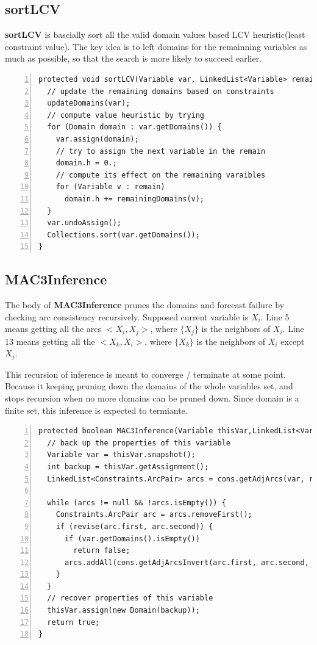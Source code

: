 \documentclass{article}
\begin{document}
\subsection{sortLCV}

\textbf{sortLCV} is bascially sort all the valid domain values based LCV heuristic(least constraint value). The key idea is to left domains for the remainning variables as much as possible, so that the search is more likely to succeed earlier.

\begin{lstlisting}[numbers=left, caption=CSPsolver.class]   
protected void sortLCV(Variable var, LinkedList<Variable> remain) {
  // update the remaining domains based on constraints
  updateDomains(var);
  // compute value heuristic by trying
  for (Domain domain : var.getDomains()) {
    var.assign(domain);
    // try to assign the next variable in the remain
    domain.h = 0.;
    // compute its effect on the remaining varaibles
    for (Variable v : remain)
      domain.h += remainingDomains(v);
  }
  var.undoAssign();
  Collections.sort(var.getDomains());
}
\end{lstlisting}









\clearpage
\subsection{MAC3Inference}

The body of \textbf{MAC3Inference} prunes the domains and forecast failure by checking arc consistency recursively. Supposed current variable is $X_i$. Line 5 means getting all the arcs $<X_i, X_j>$, where $\{X_j\}$ is the neighbors of $X_i$. Line 13 means getting all the $<X_k, X_i>$, where $\{X_k\}$ is the neighbors of $X_i$ except $X_j$.

This recursion of inference is meant to converge / terminate at some point.  Because it keeping pruning down the domains of the whole variables set, and stops recursion when no more domains can be pruned down. Since domain is a finite set, this inference is expected to termiante.

\begin{lstlisting}[numbers=left, caption=CSPsolver.class]  
protected boolean MAC3Inference(Variable thisVar,LinkedList<Variable> remain){
  // back up the properties of this variable
  Variable var = thisVar.snapshot();
  int backup = thisVar.getAssignment();
  LinkedList<Constraints.ArcPair> arcs = cons.getAdjArcs(var, remain);

  while (arcs != null && !arcs.isEmpty()) {
    Constraints.ArcPair arc = arcs.removeFirst();
    if (revise(arc.first, arc.second)) {
      if (var.getDomains().isEmpty())
        return false;
      arcs.addAll(cons.getAdjArcsInvert(arc.first, arc.second, remain));
    }
  }
  // recover properties of this variable
  thisVar.assign(new Domain(backup));
  return true;
}
\end{lstlisting}
\end{document}
